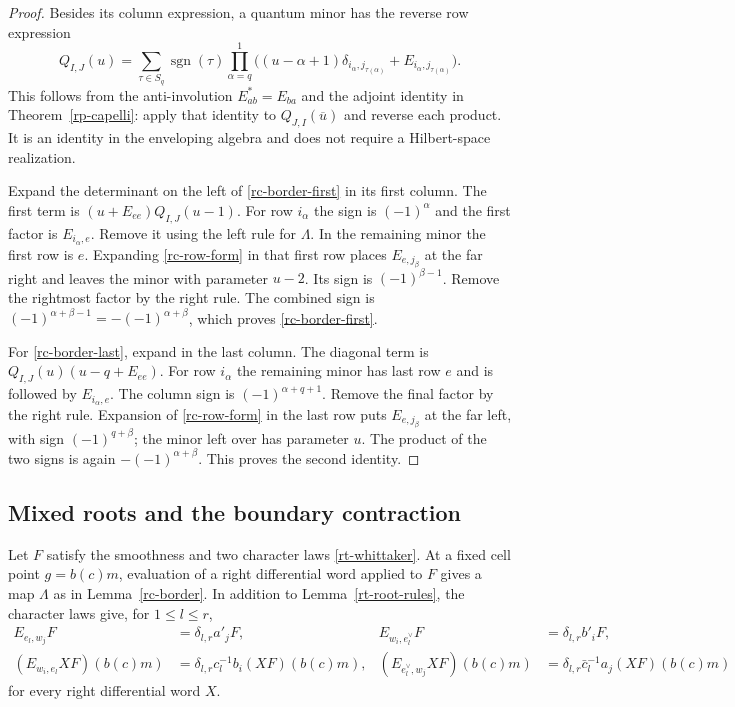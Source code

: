 \begin{proof}
Besides its column expression, a quantum minor has
the reverse row expression
\begin{equation}\label{rc-row-form}
 Q_{I,J}(u)=
 \sum_{\tau\in S_q}\operatorname{sgn}(\tau)
 \prod_{\alpha=q}^{1}
 \bigl((u-\alpha+1)\delta_{i_\alpha,j_{\tau(\alpha)}}
                                  +E_{i_\alpha,j_{\tau(\alpha)}}\bigr).
\end{equation}
This follows from the anti-involution
$E_{ab}^*=E_{ba}$ and the adjoint identity in
Theorem~\ref{rp-capelli}: apply that identity to
$Q_{J,I}(\overline u)$ and reverse each product.
It is an identity in the enveloping algebra and
does not require a Hilbert-space realization.

Expand the determinant on the left of
\eqref{rc-border-first} in its first column.
The first term is
$(u+E_{ee})Q_{I,J}(u-1)$.
For row $i_\alpha$ the sign is $(-1)^\alpha$
and the first factor is $E_{i_\alpha,e}$.
Remove it using the left rule for $\Lambda$.
In the remaining minor the first row is $e$.
Expanding \eqref{rc-row-form} in that first row
places $E_{e,j_\beta}$ at the far right and
leaves the minor with parameter $u-2$.
Its sign is $(-1)^{\beta-1}$.
Remove the rightmost factor by the right rule.
The combined sign is
$(-1)^{\alpha+\beta-1}=-(-1)^{\alpha+\beta}$,
which proves \eqref{rc-border-first}.

For \eqref{rc-border-last}, expand in the last
column.  The diagonal term is
$Q_{I,J}(u)(u-q+E_{ee})$.
For row $i_\alpha$ the remaining minor has last
row $e$ and is followed by $E_{i_\alpha,e}$.
The column sign is $(-1)^{\alpha+q+1}$.
Remove the final factor by the right rule.
Expansion of \eqref{rc-row-form} in the last
row puts $E_{e,j_\beta}$ at the far left,
with sign $(-1)^{q+\beta}$; the minor left
over has parameter $u$.
The product of the two signs is again
$-(-1)^{\alpha+\beta}$.
This proves the second identity.
\end{proof}

\subsection{Mixed roots and the boundary contraction}

Let $F$ satisfy the smoothness and two character
laws \eqref{rt-whittaker}.  At a fixed cell point
$g=b(c)m$, evaluation of a right differential word
applied to $F$ gives a map $\Lambda$ as in
Lemma~\ref{rc-border}.
In addition to Lemma~\ref{rt-root-rules}, the
character laws give, for $1\leq l\leq r$,
\begin{align}
 E_{e_l,w_j}F&=\delta_{l,r}a'_jF,&
 E_{w_i,e_l^\vee}F&=\delta_{l,r}b'_iF,
                                                     \label{rc-mixed-right}\\
 (E_{w_i,e_l}XF)(b(c)m)
     &=\delta_{l,r}c_l^{-1}b_i(XF)(b(c)m),&
 (E_{e_l^\vee,w_j}XF)(b(c)m)
     &=\delta_{l,r}\bar c_l^{-1}a_j(XF)(b(c)m)
                                                     \label{rc-mixed-left}
\end{align}
for every right differential word $X$.

